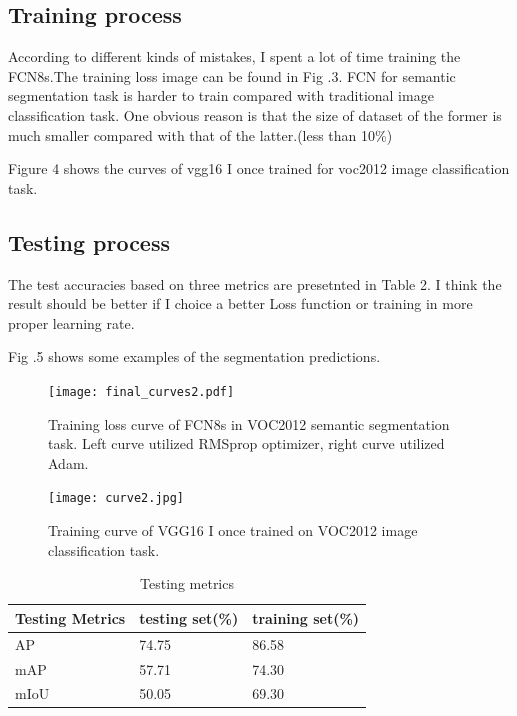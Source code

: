 \documentclass[transmag]{IEEEtran}
\begin{document}
\subsection{Training process}
According to different kinds of mistakes, I spent a lot of time training the FCN8s.The training loss image can be found in Fig .3.
FCN for semantic segmentation task is harder to train compared with traditional image 
classification task. One obvious reason is that 
the size of dataset of the former is much smaller compared with that of the latter.(less than 10\%)

Figure 4 shows the curves of vgg16 I once trained for voc2012 image classification task.



\subsection{Testing process}
The test accuracies based on three metrics are presetnted in Table 2. I think the result should be better if I choice a better Loss
function or training in more proper learning rate.

Fig .5 shows some examples of the segmentation predictions.

\begin{figure}
  \centerline{\texttt{[image: final\_curves2.pdf]}}
  \caption{Training loss curve of FCN8s in VOC2012 semantic segmentation task\label{fig2}. Left curve utilized RMSprop optimizer, right
  curve utilized Adam.}
  \end{figure}

  
\begin{figure}
  \centerline{\texttt{[image: curve2.jpg]}}
  \caption{Training curve of VGG16 I once trained on VOC2012 image classification task.\label{fig2}}
  \end{figure}

  \begin{table}
    \centering
  \caption{Testing metrics}
  \label{table}
  \setlength{\tabcolsep}{3pt}

  \begin{tabular}{|p{80pt}|p{80pt}|p{80pt}|}  
    \hline
    Testing Metrics   &  testing set(\%)  & training set(\%)\\
    \hline
    AP              &    74.75   &86.58 \\
    mAP                  & 57.71 &74.30\\
    mIoU              &    50.05  &69.30  \\
    \hline
 
 
  

  \end{tabular}
  \label{tab1}
  \end{table}
\end{document}
